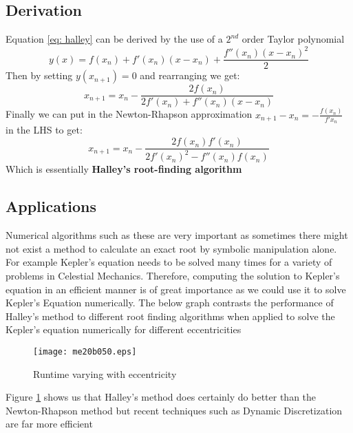 \subsection{Derivation}
\indent Equation \ref{eq: halley} can be derived by the use of a $2^{nd}$ order Taylor polynomial
\begin{equation}
        y(x) = f(x_{n}) + f'(x_{n})(x-x_{n}) + \frac{f''(x_{n})(x-x_{n})^2}{2}
\end{equation}
Then by setting $y(x_{n+1}) = 0$ and rearranging we get:
\begin{equation}
        x_{n+1} = x_{n} - \frac{2f(x_{n})}{2f'(x_{n}) + f''(x_{n})(x-x_{n})}
\end{equation}
Finally we can put in the Newton-Rhapson approximation
\newline \indent $ x_{n+1}-x_{n} = -\frac{f(x_{n})}{f'{x_n}} $ in the LHS to get:
\begin{equation}
        x_{n+1} = x_{n} - \frac{2f(x_{n})f'(x_{n})}{2f'(x_{n})^2 - f''(x_{n})f(x_n)}
\end{equation}
Which is essentially \textbf{Halley's root-finding algorithm}

\subsection{Applications}
Numerical algorithms such as these are very important as sometimes there might not exist a method to calculate an exact root by symbolic manipulation alone.
\newline For example Kepler's equation needs to be solved many times for a variety of problems in Celestial Mechanics\cite{Fein}. Therefore, computing the solution to Kepler's equation in an efficient manner
is of great importance as we could use it to solve Kepler's Equation numerically\cite{Fein}. The below graph contrasts the performance of Halley's method to different root finding algorithms when
applied to solve the Kepler's equation numerically for different eccentricities \cite{Fein}

\begin{figure}[h]
        \begin{center}
                \texttt{[image: me20b050.eps]}
        \end{center}
        \caption{Runtime varying with eccentricity}
        \label{fig: runtime}
\end{figure}

Figure \ref{fig: runtime} shows us that Halley's method does certainly do better than the Newton-Rhapson method but recent techniques such as Dynamic Discretization are far more efficient

\newpage
